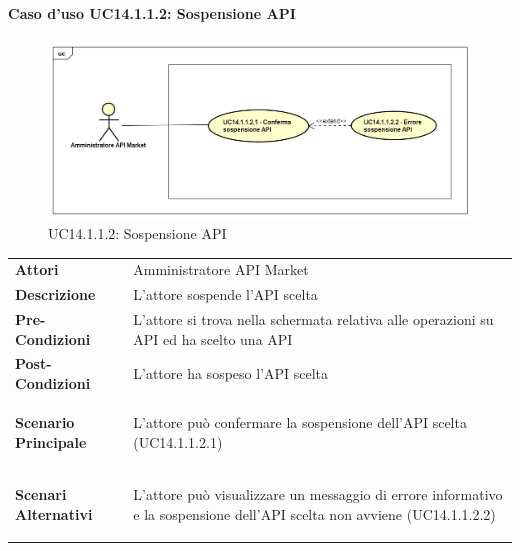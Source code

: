 \newpage
\paragraph{Caso d'uso UC14.1.1.2: Sospensione API}
\label{UC14_1_1_2}
\begin{figure}[ht]
	\centering
	\includegraphics[scale=0.45]{UML/UC14_1_1_2.png}
	\caption{UC14.1.1.2: Sospensione API}
\end{figure}

\begin{minipage}{\linewidth}
	\begin{tabular}{ l | p{11cm}}
		\hline
		\rowcolor{Gray}
		\multicolumn{2}{c}{UC14.1.1.2 - Sospensione API} \\
		\hline
		\textbf{Attori} & Amministratore API Market \\
		\textbf{Descrizione} & L'attore sospende l'API scelta \\
		\textbf{Pre-Condizioni} & L'attore si trova nella schermata relativa alle operazioni su API ed ha scelto una API \\
		\textbf{Post-Condizioni} & L'attore ha sospeso l'API scelta \\
		\textbf{Scenario Principale} & 
		\begin{enumerate*}[label=(\arabic*.),itemjoin={\newline}]
			\item L'attore può confermare la sospensione dell'API scelta (UC14.1.1.2.1)
		\end{enumerate*}\\
		\textbf{Scenari Alternativi} & 
		\begin{enumerate*}[label=(\arabic*.),itemjoin={\newline}]
			\item L'attore può visualizzare un messaggio di errore informativo e la sospensione dell'API scelta non avviene (UC14.1.1.2.2)
		\end{enumerate*}\\
	\end{tabular}
\end{minipage}

